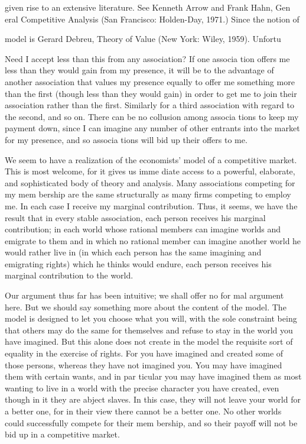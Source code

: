 \documentclass[11pt,openany]{book}
\begin{document}
given rise to an extensive literature. See Kenneth Arrow and Frank Hahn, Gen eral Competitive Analysis (San Francisco: Holden-Day, 1971.) Since the notion of 

model is Gerard Debreu, Theory of Value (New York: Wiley, 1959). Unfortu

Need I accept less than this from any association? If one associa tion offers me less than they would gain from my presence, it will be to the advantage of another association that values my presence equally to offer me something more than the first (though less than they would gain) in order to get me to join their association rather than the first. Similarly for a third association with regard to the second, and so on. There can be no collusion among associa tions to keep my payment down, since I can imagine any number of other entrants into the market for my presence, and so associa tions will bid up their offers to me. 

We seem to have a realization of the economists' model of a competitive market. This is most welcome, for it gives us imme diate access to a powerful, elaborate, and sophisticated body of theory and analysis. Many associations competing for my mem bership are the same structurally as many firms competing to employ me. In each case I receive my marginal contribution. Thus, it seems, we have the result that in every stable association, each person receives his marginal contribution; in each world whose rational members can imagine worlds and emigrate to them and in which no rational member can imagine another world he would rather live in (in which each person has the same imagining and emigrating rights) which he thinks would endure, each person receives his marginal contribution to the world. 

Our argument thus far has been intuitive; we shall offer no for mal argument here. But we should say something more about the content of the model. The model is designed to let you choose what you will, with the sole constraint being that others may do the same for themselves and refuse to stay in the world you have imagined. But this alone does not create in the model the requisite sort of equality in the exercise of rights. For you have imagined and created some of those persons, whereas they have not imagined you. You may have imagined them with certain wants, and in par ticular you may have imagined them as most wanting to live in a world with the precise character you have created, even though in it they are abject slaves. In this case, they will not leave your world for a better one, for in their view there cannot be a better one. No other worlds could successfully compete for their mem bership, and so their payoff will not be bid up in a competitive market. 
\end{document}
